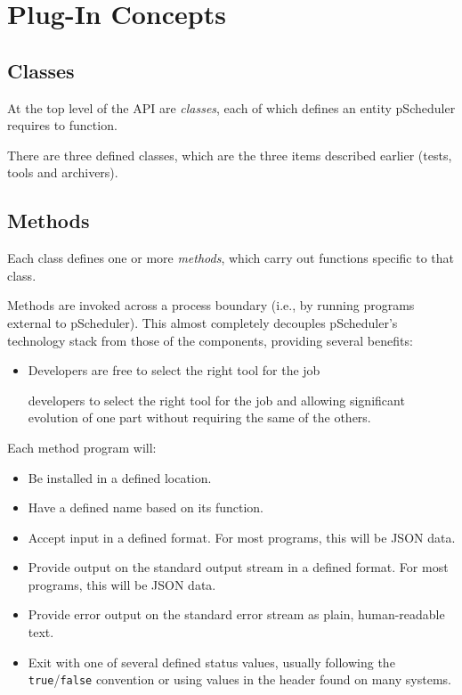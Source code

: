 \documentclass[10pt,titlepage]{article}
\begin{document}
\section{Plug-In Concepts}

\subsection{Classes}

At the top level of the API are {\it classes}, each of which defines
an entity pScheduler requires to function.

There are three defined classes, which are the three items described
earlier (tests, tools and archivers).

\subsection{Methods}

Each class defines one or more {\it methods}, which carry out
functions specific to that class.

Methods are invoked across a process boundary (i.e., by running
programs external to pScheduler).  This almost completely decouples
pScheduler's technology stack from those of the components, providing
several benefits:

\begin{itemize}
\item Developers are free to select the right tool for the job 

developers to select the right tool for the job and allowing
significant evolution of one part without requiring the same of the
others.
\end{itemize}

Each method program will:

\begin{itemize}
\item Be installed in a defined location.
\item Have a defined name based on its function.
\item Accept input in a defined format.  For most programs, this will
  be JSON data.
\item Provide output on the standard output stream in a defined
  format.  For most programs, this will be JSON data.
\item Provide error output on the standard error stream as plain,
  human-readable text.
\item Exit with one of several defined status values, usually
  following the {\tt true}/{\tt false} convention or using values in
  the  header found on many systems.
\end{itemize}
\end{document}
